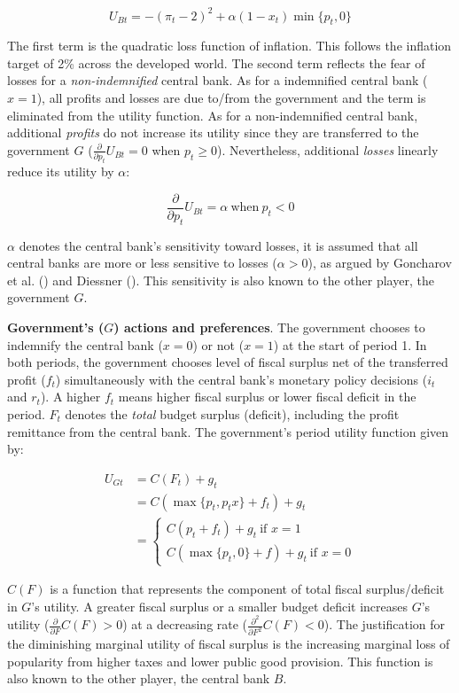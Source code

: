 \documentclass[
  a4paper,
  abstract=true]{scrartcl}
\theoremstyle{definition}
\begin{document}
\[
U_{Bt} = -(\pi_t-2)^2 + \alpha(1-x_t)\min\{p_t,0\}
\]

The first term is the quadratic loss function of inflation. This follows
the inflation target of 2\% across the developed world. The second term
reflects the fear of losses for a \emph{non-indemnified} central bank.
As for a indemnified central bank (\(x=1\)), all profits and losses are
due to/from the government and the term is eliminated from the utility
function. As for a non-indemnified central bank, additional
\emph{profits} do not increase its utility since they are transferred to
the government \(G\) (\(\frac{\partial}{\partial p_t}U_{Bt}=0\) when
\(p_t\geq0\)). Nevertheless, additional \emph{losses} linearly reduce
its utility by \(\alpha\):

\[
\frac{\partial}{\partial p_t}U_{Bt}=\alpha~\text{when}~p_t<0
\]

\(\alpha\) denotes the central bank's sensitivity toward losses, it is
assumed that all central banks are more or less sensitive to losses
(\(\alpha>0\)), as argued by Goncharov et al.
() and Diessner
(). This sensitivity is also known to
the other player, the government \(G\).

\textbf{Government's (}\(G\)\textbf{) actions and preferences}. The
government chooses to indemnify the central bank (\(x=0\)) or not
(\(x=1\)) at the start of period 1. In both periods, the government
chooses level of fiscal surplus net of the transferred profit (\(f_t\))
simultaneously with the central bank's monetary policy decisions
(\(i_t\) and \(r_t\)). A higher \(f_t\) means higher fiscal surplus or
lower fiscal deficit in the period. \(F_t\) denotes the \emph{total}
budget surplus (deficit), including the profit remittance from the
central bank. The government's period utility function given by:

\begin{align*}
U_{Gt} &=C(F_t)+ g_t \\
&=C(\max\{p_t,p_tx\}+f_t)+ g_t \\
&=\begin{cases}
C(p_t+f_t)+g_t~\text{if } x=1 \\
C(\max\{p_t,0\}+f)+g_t~\text{if } x=0
\end{cases}
\end{align*}

\(C( F)\) is a function that represents the component of total fiscal
surplus/deficit in \(G\)'s utility. A greater fiscal surplus or a
smaller budget deficit increases \(G\)'s utility
(\(\frac{\partial}{\partial F}C(F)>0\)) at a decreasing rate
(\(\frac{\partial^2}{\partial F^2}C(F)<0\)). The justification for the
diminishing marginal utility of fiscal surplus is the increasing
marginal loss of popularity from higher taxes and lower public good
provision. This function is also known to the other player, the central
bank \(B\).
\end{document}
